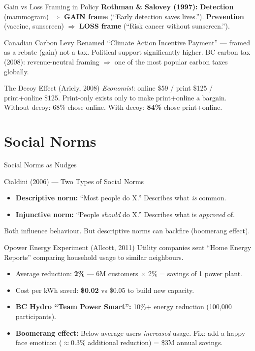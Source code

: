 \documentclass[aspectratio=169]{beamer}
\begin{document}
\begin{frame}{Gain vs Loss Framing in Policy}
\textcolor{beblue}{\textbf{Rothman \& Salovey (1997):}} \textbf{Detection} (mammogram) $\Rightarrow$ \textcolor{beteal}{\textbf{GAIN frame}} (``Early detection saves lives.''). \textbf{Prevention} (vaccine, sunscreen) $\Rightarrow$ \textcolor{berust}{\textbf{LOSS frame}} (``Risk cancer without sunscreen.'').
\begin{exampleblock}{Canadian Carbon Levy}
Renamed ``Climate Action Incentive Payment'' --- framed as a rebate (gain) not a tax. Political support significantly higher. BC carbon tax (2008): revenue-neutral framing $\Rightarrow$ one of the most popular carbon taxes globally.
\end{exampleblock}
\begin{alertblock}{The Decoy Effect (Ariely, 2008)}
\textit{Economist}: online \$59 / print \$125 / print+online \$125. Print-only exists only to make print+online a bargain. Without decoy: 68\% chose online. With decoy: \textbf{84\%} chose print+online.
\end{alertblock}
\end{frame}

\section{Social Norms}

\begin{frame}{Social Norms as Nudges}
\begin{block}{Cialdini (2006) --- Two Types of Social Norms}
\begin{itemize}
  \item \textbf{Descriptive norm:} ``Most people do X.'' Describes what \textit{is} common.
  \item \textbf{Injunctive norm:} ``People \textit{should} do X.'' Describes what is \textit{approved} of.
\end{itemize}
Both influence behaviour. But descriptive norms can \alert{backfire} (boomerang effect).
\end{block}
\begin{exampleblock}{Opower Energy Experiment (Allcott, 2011)}
\small Utility companies sent ``Home Energy Reports'' comparing household usage to similar neighbours.
\begin{itemize}\setlength{\itemsep}{0pt}
  \item Average reduction: \textbf{2\%} --- 6M customers $\times$ 2\% = savings of 1 power plant.
  \item Cost per kWh saved: \textbf{\$0.02} vs \$0.05 to build new capacity.
  \item \textbf{BC Hydro ``Team Power Smart'':} 10\%+ energy reduction (100,000 participants).
  \item \textbf{Boomerang effect:} Below-average users \textit{increased} usage. Fix: add a happy-face emoticon ($\approx 0.3\%$ additional reduction) = \$3M annual savings.
\end{itemize}
\end{exampleblock}
\end{frame}
\end{document}
